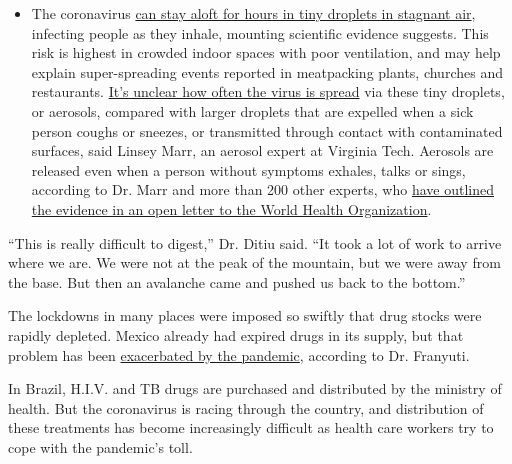 \begin{itemize}
  \begin{itemize}
  \tightlist
  \item
    The coronavirus
    \href{https://www.nytimes3xbfgragh.onion/2020/07/04/health/239-experts-with-one-big-claim-the-coronavirus-is-airborne.html?action=click\&pgtype=Article\&state=default\&region=MAIN_CONTENT_3\&context=storylines_faq}{can
    stay aloft for hours in tiny droplets in stagnant air}, infecting
    people as they inhale, mounting scientific evidence suggests. This
    risk is highest in crowded indoor spaces with poor ventilation, and
    may help explain super-spreading events reported in meatpacking
    plants, churches and restaurants.
    \href{https://www.nytimes3xbfgragh.onion/2020/07/06/health/coronavirus-airborne-aerosols.html?action=click\&pgtype=Article\&state=default\&region=MAIN_CONTENT_3\&context=storylines_faq}{It's
    unclear how often the virus is spread} via these tiny droplets, or
    aerosols, compared with larger droplets that are expelled when a
    sick person coughs or sneezes, or transmitted through contact with
    contaminated surfaces, said Linsey Marr, an aerosol expert at
    Virginia Tech. Aerosols are released even when a person without
    symptoms exhales, talks or sings, according to Dr. Marr and more
    than 200 other experts, who
    \href{https://academic.oup.com/cid/article/doi/10.1093/cid/ciaa939/5867798}{have
    outlined the evidence in an open letter to the World Health
    Organization}.
  \end{itemize}
\end{itemize}

``This is really difficult to digest,'' Dr. Ditiu said. ``It took a lot
of work to arrive where we are. We were not at the peak of the mountain,
but we were away from the base. But then an avalanche came and pushed us
back to the bottom.''

The lockdowns in many places were imposed so swiftly that drug stocks
were rapidly depleted. Mexico already had expired drugs in its supply,
but that problem has been
\href{https://www.reuters.com/article/us-health-coronavirus-lgbt-aids/no-medicine-no-food-coronavirus-restrictions-amplify-health-risks-to-lgbt-people-with-hiv-idUSKBN22W28G}{exacerbated
by the pandemic}, according to Dr. Franyuti.

In Brazil, H.I.V. and TB drugs are purchased and distributed by the
ministry of health. But the coronavirus is racing through the country,
and distribution of these treatments has become increasingly difficult
as health care workers try to cope with the pandemic's toll.

